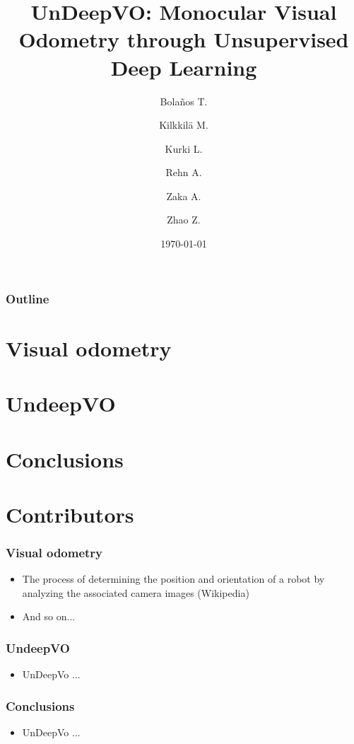 \documentclass{beamer}
\title[UndeepVO]{UnDeepVO: Monocular Visual Odometry through Unsupervised Deep Learning}
\author{
    Bolaños T.\\
    \and
    Kilkkilä M.\\
    \and
    Kurki L.\\
    \and
    Rehn A.\\
    \and
    Zaka A.\\
    \and
    Zhao Z.
}
\date{\today}
\begin{document}
\begin{frame}
    \titlepage
\end{frame}

\begin{frame}
    \frametitle{Outline}
    \tableofcontents
\end{frame}

\section{Visual odometry}
\section{UndeepVO}
\section{Conclusions}
\section{Contributors}

\begin{frame}
    \frametitle{Visual odometry}
    \begin{itemize}
        \item The process of determining the position and orientation of a robot by analyzing the associated camera images (Wikipedia)
        \item And so on...
    \end{itemize}
\end{frame}

\begin{frame}
    \frametitle{UndeepVO}
    \begin{itemize}
        \item UnDeepVo ...
    \end{itemize}
\end{frame}

\begin{frame}
    \frametitle{Conclusions}
    \begin{itemize}
        \item UnDeepVo ...
    \end{itemize}
\end{frame}
\end{document}
